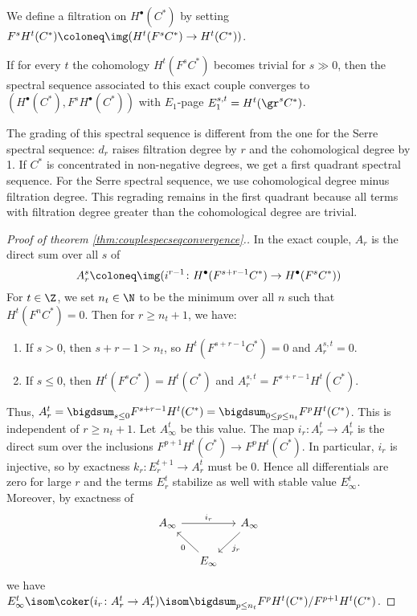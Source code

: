 We define a filtration on $H^\bullet(C^*)$ by setting $F^s H^t(C^*) \coloneq \img(H^t(F^s C^*) \to H^t(C^*))$.
\begin{theorem}\label{thm:couplespecseqconvergence}
	If for every $t$ the cohomology $H^t(F^s C^*)$ becomes trivial for $s \gg 0$, then the spectral sequence associated to this exact couple converges to $(H^\bullet(C^*), F^s H^\bullet(C^*))$ with $E_1$-page $E_1^{s, t} = H^t(\gr^s C^*)$.
\end{theorem}
\begin{remark}
	The grading of this spectral sequence is different from the one for the Serre spectral sequence: $d_r$ raises filtration degree by $r$ and the cohomological degree by 1.
	If $C^*$ is concentrated in non-negative degrees, we get a first quadrant spectral sequence.
	For the Serre spectral sequence, we use cohomological degree minus filtration degree.
	This regrading remains in the first quadrant because all terms with filtration degree greater than the cohomological degree are trivial.
\end{remark}
\begin{proof}[Proof of theorem \ref{thm:couplespecseqconvergence}.]
	In the exact couple, $A_r$ is the direct sum over all $s$ of
	\begin{equation*}
		A_r^s \coloneq \img(i^{r - 1}\colon H^\bullet(F^{s + r - 1} C^*) \to H^\bullet(F^s C^*))
	\end{equation*}
	For $t \in \Z$, we set $n_t \in \N$ to be the minimum over all $n$ such that $H^t(F^n C^*) = 0$.
	Then for $r \geq n_t + 1$, we have:
	\begin{enumerate}
		\item If $s > 0$, then $s + r - 1 > n_t$, so $H^t(F^{s + r - 1} C^*) = 0$ and $A_r^{s, t} = 0$. %
		\item If $s \leq 0$, then $H^t(F^s C^*) = H^t(C^*)$ and $A_r^{s, t} = F^{s + r - 1} H^t(C^*)$.
	\end{enumerate}
	Thus, $A_r^t = \bigdsum_{s \leq 0} F^{s + r - 1} H^t(C^*) = \bigdsum_{0 \leq p \leq n_t} F^p H^t(C^*)$.
	This is independent of $r \geq n_t + 1$.
	Let $A_\infty^t$ be this value.
	The map $i_r\colon A_r^t \to A_r^t$ is the direct sum over the inclusions $F^{p + 1} H^t(C^*) \to F^p H^t(C^*)$.
	In particular, $i_r$ is injective, so by exactness $k_r\colon E_r^{t + 1} \to A_r^t$ must be 0.
	Hence all differentials are zero for large $r$ and the terms $E_r^t$ stabilize as well with stable value $E_\infty^t$.
	Moreover, by exactness of
	\begin{equation*}
		\begin{tikzcd}[column sep = small]
			A_\infty
					\ar[rr, "i_r"]
				& & A_\infty
					\ar[dl, "j_r"]
			\\
				& E_\infty
					\ar[ul, "0"]
		\end{tikzcd}
	\end{equation*}
	we have $E_\infty^t \isom \coker(i_r\colon A_r^t \to A_r^t) \isom \bigdsum_{p \leq n_t} F^p H^t(C^*) / F^{p + 1} H^t(C^*)$.
\end{proof}
